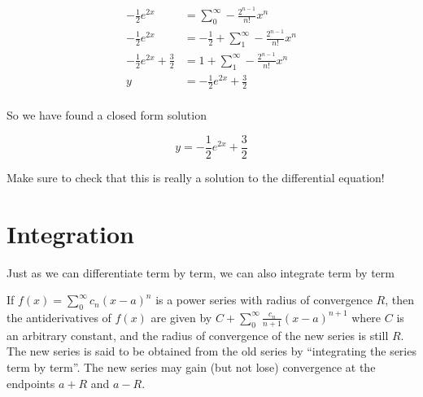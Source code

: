 \documentclass{ximera}
\begin{document}
\begin{example}
\begin{align*}
-\frac{1}{2} e^{2x} &= \sum_0^\infty -\frac{2^{n-1}}{n!} x^n\\
-\frac{1}{2} e^{2x} &= -\frac{1}{2}+ \sum_1^\infty -\frac{2^{n-1}}{n!} x^n\\
-\frac{1}{2} e^{2x} +\frac{3}{2}&= 1+ \sum_1^\infty -\frac{2^{n-1}}{n!} x^n\\
y &= -\frac{1}{2} e^{2x} +\frac{3}{2}\\
\end{align*}

So we have found a closed form solution

\[
y = -\frac{1}{2} e^{2x} +\frac{3}{2}
\]

Make sure to check that this is really a solution to the differential equation!

\end{example}

\section{Integration}

Just as we can differentiate term by term, we can also integrate term by term

\begin{theorem}
	If $f(x) = \sum_0^\infty c_n(x-a)^n$ is a power series with radius of convergence $R$, then the antiderivatives of $f(x)$ are given by $C + \sum_0^\infty \frac{c_n}{n+1}(x-a)^{n+1}$ where $C$ is an arbitrary constant, and the radius of convergence of the new series is still $R$.  The new series is said to be obtained from the old series by ``integrating the series term by term''.  The new series may gain (but not lose) convergence at the endpoints $a+R$ and $a-R$.
\end{theorem}
\end{document}
